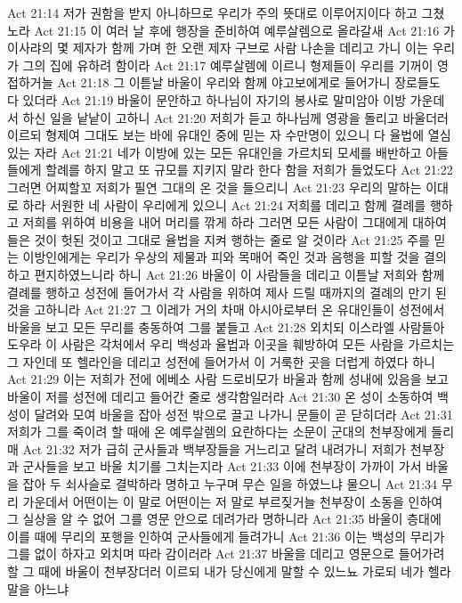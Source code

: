 Act 21:14  저가 권함을 받지 아니하므로 우리가 주의 뜻대로 이루어지이다 하고 그쳤노라
Act 21:15  이 여러 날 후에 행장을 준비하여 예루살렘으로 올라갈새
Act 21:16  가이사랴의 몇 제자가 함께 가며 한 오랜 제자 구브로 사람 나손을 데리고 가니 이는 우리가 그의 집에 유하려 함이라
Act 21:17  예루살렘에 이르니 형제들이 우리를 기꺼이 영접하거늘
Act 21:18  그 이튿날 바울이 우리와 함께 야고보에게로 들어가니 장로들도 다 있더라
Act 21:19  바울이 문안하고 하나님이 자기의 봉사로 말미암아 이방 가운데서 하신 일을 낱낱이 고하니
Act 21:20  저희가 듣고 하나님께 영광을 돌리고 바울더러 이르되 형제여 그대도 보는 바에 유대인 중에 믿는 자 수만명이 있으니 다 율법에 열심 있는 자라
Act 21:21  네가 이방에 있는 모든 유대인을 가르치되 모세를 배반하고 아들들에게 할례를 하지 말고 또 규모를 지키지 말라 한다 함을 저희가 들었도다
Act 21:22  그러면 어찌할꼬 저희가 필연 그대의 온 것을 들으리니
Act 21:23  우리의 말하는 이대로 하라 서원한 네 사람이 우리에게 있으니
Act 21:24  저희를 데리고 함께 결례를 행하고 저희를 위하여 비용을 내어 머리를 깎게 하라 그러면 모든 사람이 그대에게 대하여 들은 것이 헛된 것이고 그대로 율법을 지켜 행하는 줄로 알 것이라
Act 21:25  주를 믿는 이방인에게는 우리가 우상의 제물과 피와 목매어 죽인 것과 음행을 피할 것을 결의하고 편지하였느니라 하니
Act 21:26  바울이 이 사람들을 데리고 이튿날 저희와 함께 결례를 행하고 성전에 들어가서 각 사람을 위하여 제사 드릴 때까지의 결례의 만기 된것을 고하니라
Act 21:27  그 이레가 거의 차매 아시아로부터 온 유대인들이 성전에서 바울을 보고 모든 무리를 충동하여 그를 붙들고
Act 21:28  외치되 이스라엘 사람들아 도우라 이 사람은 각처에서 우리 백성과 율법과 이곳을 훼방하여 모든 사람을 가르치는 그 자인데 또 헬라인을 데리고 성전에 들어가서 이 거룩한 곳을 더럽게 하였다 하니
Act 21:29  이는 저희가 전에 에베소 사람 드로비모가 바울과 함께 성내에 있음을 보고 바울이 저를 성전에 데리고 들어간 줄로 생각함일러라
Act 21:30  온 성이 소동하여 백성이 달려와 모여 바울을 잡아 성전 밖으로 끌고 나가니 문들이 곧 닫히더라
Act 21:31  저희가 그를 죽이려 할 때에 온 예루살렘의 요란하다는 소문이 군대의 천부장에게 들리매
Act 21:32  저가 급히 군사들과 백부장들을 거느리고 달려 내려가니 저희가 천부장과 군사들을 보고 바울 치기를 그치는지라
Act 21:33  이에 천부장이 가까이 가서 바울을 잡아 두 쇠사슬로 결박하라 명하고 누구며 무슨 일을 하였느냐 물으니
Act 21:34  무리 가운데서 어떤이는 이 말로 어떤이는 저 말로 부르짖거늘 천부장이 소동을 인하여 그 실상을 알 수 없어 그를 영문 안으로 데려가라 명하니라
Act 21:35  바울이 층대에 이를 때에 무리의 포행을 인하여 군사들에게 들려가니
Act 21:36  이는 백성의 무리가 그를 없이 하자고 외치며 따라 감이러라
Act 21:37  바울을 데리고 영문으로 들어가려 할 그 때에 바울이 천부장더러 이르되 내가 당신에게 말할 수 있느뇨 가로되 네가 헬라 말을 아느냐
